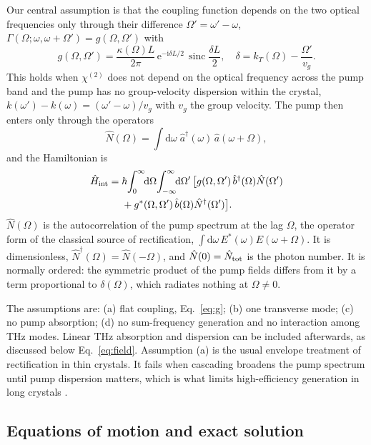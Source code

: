 \documentclass[aps,pra,reprint,superscriptaddress,amsmath,amssymb,floatfix]{revtex4-2}
\newcommand{\Nop}{\hat N}
\newcommand{\dd}{\mathrm{d}}
\newcommand{\ee}{\mathrm{e}}
\newcommand{\ii}{\mathrm{i}}
\newcommand{\sinc}{\operatorname{sinc}}
\begin{document}
Our central assumption is that the coupling function depends on the two
optical frequencies only through their difference $\Omega'=\omega'-\omega$,
$\Gamma(\Omega;\omega,\omega+\Omega')=g(\Omega,\Omega')$ with
\begin{equation}
g(\Omega,\Omega')=\frac{\kappa(\Omega)L}{2\pi}\,\ee^{-\ii\delta L/2}\,
\sinc\frac{\delta L}{2},\quad
\delta=k_T(\Omega)-\frac{\Omega'}{v_g}.
\label{eq:g}
\end{equation}
This holds when $\chi^{(2)}$ does not depend on the optical frequency across
the pump band and the pump has no group-velocity dispersion within the
crystal, $k(\omega')-k(\omega)=(\omega'-\omega)/v_g$ with $v_g$ the group
velocity. The pump then enters only through the operators
\begin{equation}
\Nop(\Omega)=\int\!\dd\omega\;\hat a^\dagger(\omega)\,\hat a(\omega+\Omega),
\label{eq:Ndef}
\end{equation}
and the Hamiltonian is
\begin{align}
\hat H_{\rm int}={}&\hbar\!\int_0^\infty\!\!\dd\Omega\!\int_{-\infty}^{\infty}\!\!\dd\Omega'\,
\big[g(\Omega,\Omega')\,\hat b^\dagger(\Omega)\Nop(\Omega')\nonumber\\
&+g^*(\Omega,\Omega')\,\hat b(\Omega)\Nop^\dagger(\Omega')\big].
\label{eq:Hint}
\end{align}
$\Nop(\Omega)$ is the autocorrelation of the pump spectrum at the lag
$\Omega$, the operator form of the classical source of rectification,
$\int\!\dd\omega\,E^*(\omega)E(\omega+\Omega)$. It is dimensionless,
$\Nop^\dagger(\Omega)=\Nop(-\Omega)$, and $\Nop(0)=\Nop_{\rm tot}$ is the
photon number. It is normally ordered: the symmetric product of the pump
fields differs from it by a term proportional to $\delta(\Omega)$, which
radiates nothing at $\Omega\neq0$.

The assumptions are: (a) flat coupling, Eq.~\eqref{eq:g};
(b) one transverse mode; (c) no pump absorption; (d) no sum-frequency
generation and no interaction among THz modes. Linear THz absorption and
dispersion can be included afterwards, as discussed below
Eq.~\eqref{eq:field}. Assumption (a) is the usual envelope treatment of
rectification in thin crystals. It fails when cascading broadens the pump
spectrum until pump dispersion matters, which is what limits high-efficiency
generation in long crystals \cite{ravi2014}.

\subsection{Equations of motion and exact solution}
\end{document}
